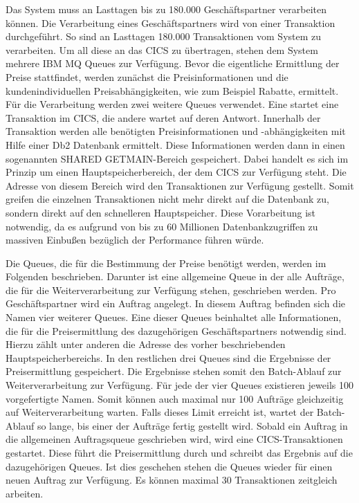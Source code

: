Das System muss an Lasttagen bis zu 180.000 Geschäftspartner verarbeiten können.
Die Verarbeitung eines Geschäftspartners wird von einer Transaktion durchgeführt.
So sind an Lasttagen 180.000 Transaktionen vom System zu verarbeiten.
Um all diese an das CICS zu übertragen, stehen dem System mehrere IBM MQ Queues zur Verfügung.
Bevor die eigentliche Ermittlung der Preise stattfindet, werden zunächst die Preisinformationen und die kundenindividuellen Preisabhängigkeiten, wie zum Beispiel Rabatte, ermittelt.
Für die Verarbeitung werden zwei weitere Queues verwendet.
Eine startet eine Transaktion im CICS, die andere wartet auf deren Antwort.
Innerhalb der Transaktion werden alle benötigten Preisinformationen und -abhängigkeiten mit Hilfe einer Db2 Datenbank ermittelt.
Diese Informationen werden dann in einen sogenannten \glqq SHARED GETMAIN\grqq-Bereich gespeichert.
Dabei handelt es sich im Prinzip um einen Hauptspeicherbereich, der dem CICS zur Verfügung steht.
Die Adresse von diesem Bereich wird den Transaktionen zur Verfügung gestellt.
Somit greifen die einzelnen Transaktionen nicht mehr direkt auf die Datenbank zu, sondern direkt auf den schnelleren Hauptspeicher.
Diese Vorarbeitung ist notwendig, da es aufgrund von bis zu 60 Millionen Datenbankzugriffen zu massiven Einbußen bezüglich der Performance führen würde.

Die Queues, die für die Bestimmung der Preise benötigt werden, werden im Folgenden beschrieben.
Darunter ist eine allgemeine Queue in der alle Aufträge, die für die Weiterverarbeitung zur Verfügung stehen, geschrieben werden.
Pro Geschäftspartner wird ein Auftrag angelegt.
In diesem Auftrag befinden sich die Namen vier weiterer Queues.
Eine dieser Queues beinhaltet alle Informationen, die für die Preisermittlung des dazugehörigen Geschäftspartners notwendig sind.
Hierzu zählt unter anderen die Adresse des vorher beschriebenden Hauptspeicherbereichs.
In den restlichen drei Queues sind die Ergebnisse der Preisermittlung gespeichert.
Die Ergebnisse stehen somit den Batch-Ablauf zur Weiterverarbeitung zur Verfügung.
Für jede der vier Queues existieren jeweils 100 vorgefertigte Namen.
Somit können auch maximal nur 100 Aufträge gleichzeitig auf Weiterverarbeitung warten.
Falls dieses Limit erreicht ist, wartet der Batch-Ablauf so lange, bis einer der Aufträge fertig gestellt wird.
Sobald ein Auftrag in die allgemeinen Auftragsqueue geschrieben wird, wird eine CICS-Transaktionen gestartet.
Diese führt die Preisermittlung durch und schreibt das Ergebnis auf die dazugehörigen Queues.
Ist dies geschehen stehen die Queues wieder für einen neuen Auftrag zur Verfügung.
Es können maximal 30 Transaktionen zeitgleich arbeiten.

